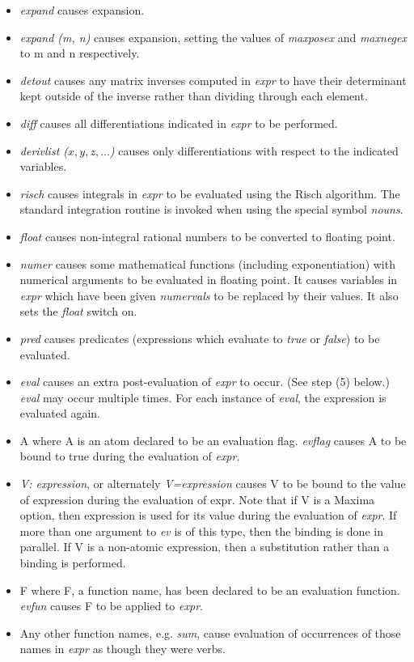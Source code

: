\documentclass[../Maxima_Workbook.tex]{subfiles}
\begin{document}
\begin{itemize}
	\item \emph{expand} causes expansion.
	\item \emph{expand (m, n)} causes expansion, setting the values of \emph{maxposex} and \emph{maxnegex} to m and n respectively.
	\item \emph{detout} causes any matrix inverses computed in \emph{expr} to have their determinant kept outside of the inverse rather than dividing through each element.
	\item \emph{diff} causes all differentiations indicated in \emph{expr} to be performed.
	\item \emph{derivlist ($ x,y,z,\dots $)} causes only differentiations with respect to the indicated variables.
	\item \emph{risch} causes integrals in \emph{expr} to be evaluated using the Risch algorithm. The standard integration routine is invoked when using the special symbol \emph{nouns}.
	\item \emph{float} causes non-integral rational numbers to be converted to floating point.
	\item \emph{numer} causes some mathematical functions (including exponentiation) with numerical arguments to be evaluated in floating point. It causes variables in \emph{expr} which have been given \emph{numervals} to be replaced by their values. It also sets the \emph{float} switch on.
	\item \emph{pred} causes predicates (expressions which evaluate to \emph{true} or \emph{false}) to be evaluated.
	\item \emph{eval} causes an extra post-evaluation of \emph{expr} to occur. (See step (5) below.) \emph{eval} may occur multiple times. For each instance of \emph{eval}, the expression is evaluated again.
	\item A where A is an atom declared to be an evaluation flag. \emph{evflag} causes A to be bound to true during the evaluation of \emph{expr}.
	\item \emph{V: expression}, or alternately \emph{V=expression} causes V to be bound to the value of expression during the evaluation of expr. Note that if V is a Maxima option, then expression is used for its value during the evaluation of \emph{expr}. If more than one argument to \emph{ev} is of this type, then the binding is done in parallel. If V is a non-atomic expression, then a substitution rather than a binding is performed.
	\item F where F, a function name, has been declared to be an evaluation function. \emph{evfun} causes F to be applied to \emph{expr}.
	\item Any other function names, e.g. \emph{sum}, cause evaluation of occurrences of those names in \emph{expr} as though they were verbs.
	

\end{itemize}
\end{document}
